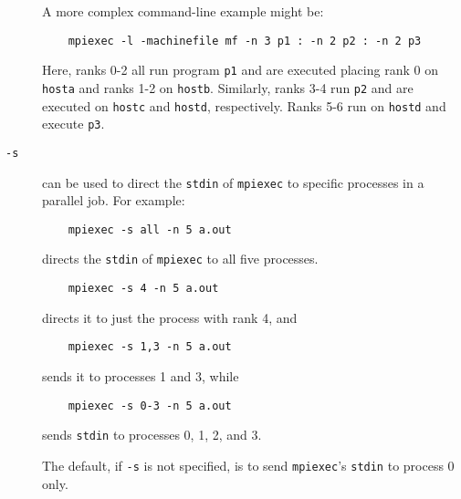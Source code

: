 \documentclass[dvipdfm,11pt]{article}
\begin{document}
\begin{description}
A more complex command-line example might be:
\begin{verbatim}
    mpiexec -l -machinefile mf -n 3 p1 : -n 2 p2 : -n 2 p3
\end{verbatim}
Here, ranks 0-2 all run program \texttt{p1} and are executed placing
rank 0 on \texttt{hosta} and ranks 1-2 on \texttt{hostb}.  Similarly,
ranks 3-4 run \texttt{p2} and are executed on \texttt{hostc} and
\texttt{hostd}, respectively.  Ranks 5-6 run on \texttt{hostd} and
execute \texttt{p3}.
\item[\texttt{-s}] can be used to direct the \texttt{stdin} of
  \texttt{mpiexec} to specific processes in a parallel job.  For
  example:
\begin{verbatim}
    mpiexec -s all -n 5 a.out
\end{verbatim}
directs the \texttt{stdin} of \texttt{mpiexec} to all five processes.
\begin{verbatim}
    mpiexec -s 4 -n 5 a.out 
\end{verbatim}
directs it to just the process with rank 4, and 
\begin{verbatim}
    mpiexec -s 1,3 -n 5 a.out 
\end{verbatim}
sends it to processes 1 and 3, while
\begin{verbatim}
    mpiexec -s 0-3 -n 5 a.out 
\end{verbatim}
sends \texttt{stdin} to processes 0, 1, 2, and 3.

The default, if \texttt{-s} is not specified, is to send
\texttt{mpiexec}'s \texttt{stdin} to process 0 only.


\end{description}
\end{document}
